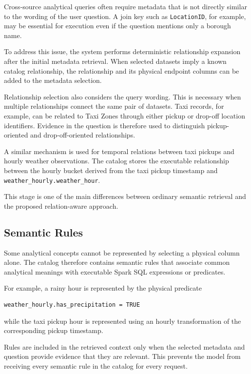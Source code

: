 Cross-source analytical queries often require metadata that is not directly
similar to the wording of the user question. A join key such as
\texttt{LocationID}, for example, may be essential for execution even if the
question mentions only a borough name.

To address this issue, the system performs deterministic relationship
expansion after the initial metadata retrieval. When selected datasets imply a
known catalog relationship, the relationship and its physical endpoint
columns can be added to the metadata selection.

Relationship selection also considers the query wording. This is necessary
when multiple relationships connect the same pair of datasets. Taxi records,
for example, can be related to Taxi Zones through either pickup or drop-off
location identifiers. Evidence in the question is therefore used to
distinguish pickup-oriented and drop-off-oriented relationships.

A similar mechanism is used for temporal relations between taxi pickups and
hourly weather observations. The catalog stores the executable relationship
between the hourly bucket derived from the taxi pickup timestamp and
\texttt{weather\_hourly.weather\_hour}.

This stage is one of the main differences between ordinary semantic retrieval
and the proposed relation-aware approach.


\subsection{Semantic Rules}

Some analytical concepts cannot be represented by selecting a physical column
alone. The catalog therefore contains semantic rules that associate common
analytical meanings with executable Spark SQL expressions or predicates.

For example, a rainy hour is represented by the physical predicate

\begin{verbatim}
weather_hourly.has_precipitation = TRUE
\end{verbatim}

while the taxi pickup hour is represented using an hourly transformation of
the corresponding pickup timestamp.

Rules are included in the retrieved context only when the selected metadata
and question provide evidence that they are relevant. This prevents the model
from receiving every semantic rule in the catalog for every request.


